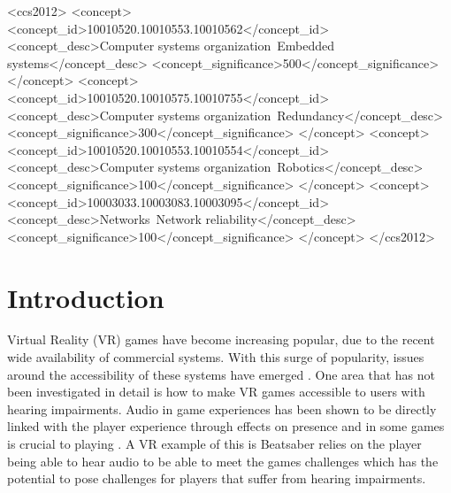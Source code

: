 \documentclass[manuscript,screen]{acmart}
\begin{document}
\begin{CCSXML}
<ccs2012>
 <concept>
  <concept_id>10010520.10010553.10010562</concept_id>
  <concept_desc>Computer systems organization~Embedded systems</concept_desc>
  <concept_significance>500</concept_significance>
 </concept>
 <concept>
  <concept_id>10010520.10010575.10010755</concept_id>
  <concept_desc>Computer systems organization~Redundancy</concept_desc>
  <concept_significance>300</concept_significance>
 </concept>
 <concept>
  <concept_id>10010520.10010553.10010554</concept_id>
  <concept_desc>Computer systems organization~Robotics</concept_desc>
  <concept_significance>100</concept_significance>
 </concept>
 <concept>
  <concept_id>10003033.10003083.10003095</concept_id>
  <concept_desc>Networks~Network reliability</concept_desc>
  <concept_significance>100</concept_significance>
 </concept>
</ccs2012>
\end{CCSXML}






\maketitle



\section{Introduction}
Virtual Reality (VR) games have become increasing popular, due to the recent wide availability of commercial systems.  With this surge of popularity, issues around the accessibility of these systems have emerged \cite{gerling2020virtual}. One area that has not been investigated in detail is how to make VR games accessible to users with hearing impairments. Audio in game experiences has been shown to be directly linked with the player experience through effects on presence \cite{rogers2020potential} and in some games is crucial to playing \cite{peerdeman2010sound}. A VR example of this is Beatsaber \cite{BeatSaber:VR} relies on the player being able to hear audio to be able to meet the games challenges which has the potential to pose challenges for players that suffer from hearing impairments.  
\end{document}
